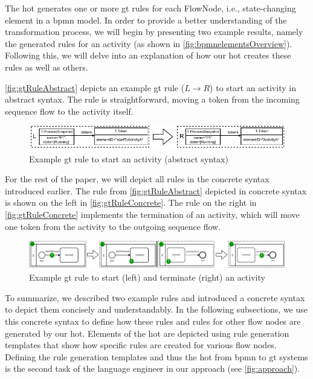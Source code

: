 \documentclass[runningheads]{lmcs}
\begin{document}
The \gls*{hot} generates one or more \gls*{gt} rules for each \textsf{FlowNode}, i.e., state-changing element in a \gls*{bpmn} model.
In order to provide a better understanding of the transformation process, we will begin by presenting two example results, namely the generated rules for an activity (as shown in \autoref{fig:bpmnelementsOverview}).
Following this, we will delve into an explanation of how our \gls*{hot} creates these rules as well as others.

\autoref{fig:gtRuleAbstract} depicts an example \gls*{gt} rule ($L \to R$) to start an activity in abstract syntax.
The rule is straightforward, moving a token from the incoming sequence flow to the activity itself.

\begin{figure}[ht]
    \centering
  \includegraphics[width=1\textwidth]{images/rule_abstract.pdf}
  \caption{Example \gls*{gt} rule to start an activity (abstract syntax)}  \label{fig:gtRuleAbstract}
\end{figure}

For the rest of the paper, we will depict all rules in the concrete syntax introduced earlier.
The rule from \autoref{fig:gtRuleAbstract} depicted in concrete syntax is shown on the left in \autoref{fig:gtRuleConcrete}.
The rule on the right in \autoref{fig:gtRuleConcrete} implements the termination of an activity, which will move one token from the activity to the outgoing sequence flow.

\begin{figure}[ht]
    \centering
  \includegraphics[width=1\textwidth]{images/rule_concrete.pdf}
  \caption{Example \gls*{gt} rule to start (left) and terminate (right) an activity}
  \label{fig:gtRuleConcrete}
\end{figure}

To summarize, we described two example rules and introduced a concrete syntax to depict them concisely and understandably.
In the following subsections, we use this concrete syntax to define how these rules and rules for other flow nodes are generated by our \gls*{hot}.
Elements of the \gls*{hot} are depicted using rule generation templates that show how specific rules are created for various flow nodes.
Defining the rule generation templates and thus the \gls*{hot} from \gls*{bpmn} to \gls*{gt} systems is the second task of the language engineer in our approach (see \autoref{fig:approach}).
\end{document}
